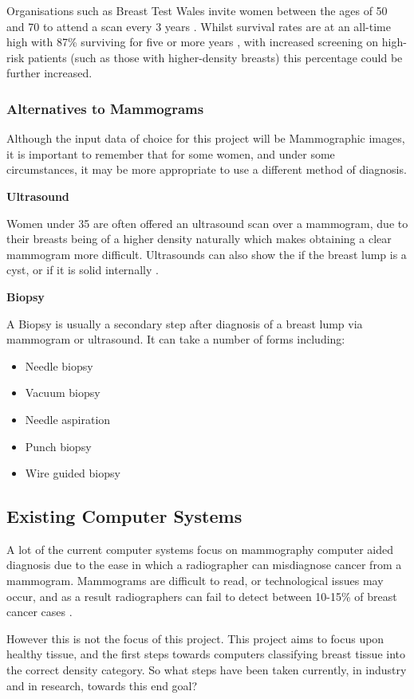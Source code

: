 Organisations such as Breast Test Wales invite women between the ages of 50 and 70 to attend a scan every 3 years \cite{Informed_Choice_about_Cancer_Screening_2013}. Whilst survival rates are at an all-time high with 87\% surviving for five or more years \cite{Breast_cancer_statistics_2015}, with increased screening on high-risk patients (such as those with higher-density breasts) this percentage could be further increased.

\subsubsection{Alternatives to Mammograms}

Although the input data of choice for this project will be Mammographic images, it is important to remember that for some women, and under some circumstances, it may be more appropriate to use a different method of diagnosis.

\noindent \textbf{Ultrasound}

Women under 35 are often offered an ultrasound scan over a mammogram, due to their breasts being of a higher density naturally which makes obtaining a clear mammogram more difficult. Ultrasounds can also show the if the breast lump is a cyst, or if it is solid internally \cite{Cancer_Research_UK_2015}.

\noindent \textbf{Biopsy}

A Biopsy is usually a secondary step after diagnosis of a breast lump via mammogram or ultrasound. It can take a number of forms including:

\begin{itemize}
  \item Needle biopsy
  \item Vacuum biopsy
  \item Needle aspiration
  \item Punch biopsy
  \item Wire guided biopsy
\end{itemize}


\subsection{Existing Computer Systems}

A lot of the current computer systems focus on mammography computer aided diagnosis due to the ease in which a radiographer can misdiagnose cancer from a mammogram. Mammograms are difficult to read, or technological issues may occur, and as a result radiographers can fail to detect between 10-15\% of breast cancer cases \cite{Champaign_Cederbom_2000}.

However this is not the focus of this project. This project aims to focus upon healthy tissue, and the first steps towards computers classifying breast tissue into the correct density category. So what steps have been taken currently, in industry and in research, towards this end goal?


